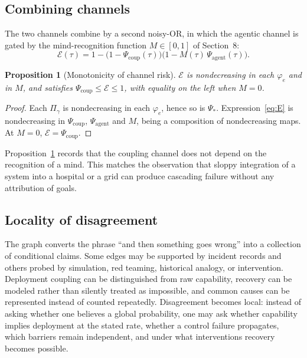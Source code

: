 \documentclass[11pt]{article}
\newtheorem{proposition}{Proposition}[section]
\theoremstyle{remark}
\begin{document}
\subsection{Combining channels}

The two channels combine by a second noisy-OR, in which the agentic channel is gated by the mind-recognition function $M\in[0,1]$ of Section~8:
\begin{equation}\label{eq:E}
\mathcal{E}(\tau)=1-\bigl(1-\Psi_{\mathrm{coup}}(\tau)\bigr)\bigl(1-M(\tau)\,\Psi_{\mathrm{agent}}(\tau)\bigr).
\end{equation}

\begin{proposition}[Monotonicity of channel risk]\label{prop:Emono}
$\mathcal{E}$ is nondecreasing in each $\varphi_e$ and in $M$, and satisfies $\Psi_{\mathrm{coup}}\le\mathcal{E}\le 1$, with equality on the left when $M=0$.
\end{proposition}
\begin{proof}
Each $\Pi_\gamma$ is nondecreasing in each $\varphi_e$, hence so is $\Psi_\ast$. Expression~\eqref{eq:E} is nondecreasing in $\Psi_{\mathrm{coup}}$, $\Psi_{\mathrm{agent}}$ and $M$, being a composition of nondecreasing maps. At $M=0$, $\mathcal{E}=\Psi_{\mathrm{coup}}$. \qedhere
\end{proof}

Proposition~\ref{prop:Emono} records that the coupling channel does not depend on the recognition of a mind. This matches the observation that sloppy integration of a system into a hospital or a grid can produce cascading failure without any attribution of goals.

\subsection{Locality of disagreement}

The graph converts the phrase ``and then something goes wrong'' into a collection of conditional claims. Some edges may be supported by incident records and others probed by simulation, red teaming, historical analogy, or intervention. Deployment coupling can be distinguished from raw capability, recovery can be modeled rather than silently treated as impossible, and common causes can be represented instead of counted repeatedly. Disagreement becomes local: instead of asking whether one believes a global probability, one may ask whether capability implies deployment at the stated rate, whether a control failure propagates, which barriers remain independent, and under what interventions recovery becomes possible.
\end{document}
